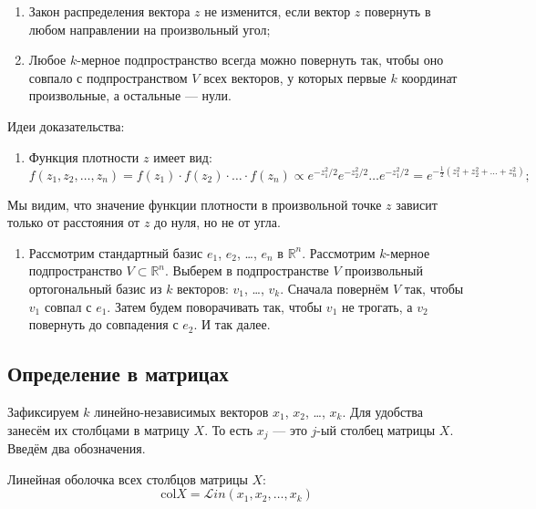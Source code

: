 \documentclass[11pt,russian,]{article}
\providecommand{\tightlist}{%
  \setlength{\itemsep}{0pt}\setlength{\parskip}{0pt}}
\newcommand{\RR}{\mathbb{R}}
\renewcommand{\Rn}{\RR^n}
\newcommand{\1}{\mathbbm{1}}
\newcommand{\Lin}{\mathcal{L}in}
\newcommand{\col}{\mathcal{col}}
\renewcommand{\col}{\mathrm{col}}
\begin{document}
\begin{enumerate}
\def\labelenumi{\arabic{enumi}.}
\item
  Закон распределения вектора \(z\) не изменится, если вектор \(z\)
  повернуть в любом направлении на произвольный угол;
\item
  Любое \(k\)-мерное подпространство всегда можно повернуть так, чтобы
  оно совпало с подпространством \(V\) всех векторов, у которых первые
  \(k\) координат произвольные, а остальные --- нули.
\end{enumerate}

Идеи доказательства:

\begin{enumerate}
\def\labelenumi{\arabic{enumi}.}
\tightlist
\item
  Функция плотности \(z\) имеет вид: \[
  f(z_1, z_2, \ldots, z_n) = f(z_1) \cdot f(z_2)\cdot \ldots \cdot f(z_n) \propto e^{-z_1^2/2}e^{-z_2^2/2}\ldots e^{-z_1^2/2} = e^{-\frac{1}{2}(z_1^2 + z_2^2 +\ldots +z_n^2)};
  \]
\end{enumerate}

Мы видим, что значение функции плотности в произвольной точке \(z\)
зависит только от расстояния от \(z\) до нуля, но не от угла.

\begin{enumerate}
\def\labelenumi{\arabic{enumi}.}
\setcounter{enumi}{1}
\tightlist
\item
  Рассмотрим стандартный базис \(e_1\), \(e_2\), \ldots, \(e_n\) в
  \(\Rn\). Рассмотрим \(k\)-мерное подпространство \(V \subset \Rn\).
  Выберем в подпространстве \(V\) произвольный ортогональный базис из
  \(k\) векторов: \(v_1\), \ldots, \(v_k\). Сначала повернём \(V\) так,
  чтобы \(v_1\) совпал с \(e_1\). Затем будем поворачивать так, чтобы
  \(v_1\) не трогать, а \(v_2\) повернуть до совпадения с \(e_2\). И так
  далее.
\end{enumerate}

\subsection{Определение в матрицах}\label{--}

Зафиксируем \(k\) линейно-независимых векторов \(x_1\), \(x_2\), \ldots,
\(x_k\). Для удобства занесём их столбцами в матрицу \(X\). То есть
\(x_j\) --- это \(j\)-ый столбец матрицы \(X\). Введём два обозначения.

Линейная оболочка всех столбцов матрицы \(X\): \[
\col X = \Lin(x_1, x_2, \ldots, x_k)
\]
\end{document}

